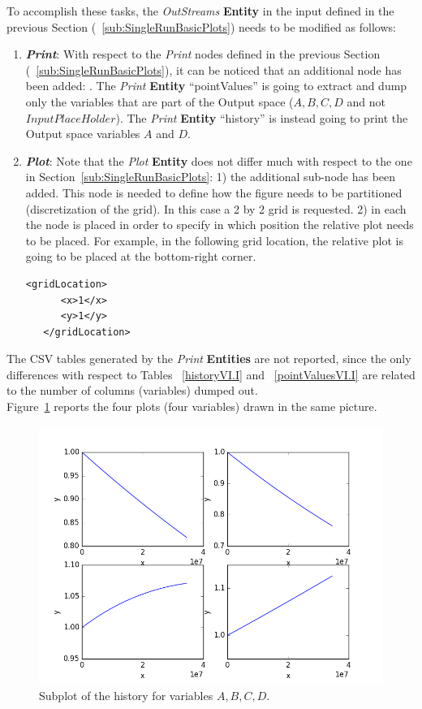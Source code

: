 To accomplish these tasks, the \textit{OutStreams} \textbf{Entity} in the input defined in the previous Section (~\ref{sub:SingleRunBasicPlots}) needs to be modified as follows:
\begin{enumerate}
   \item \textbf{\textit{Print}}:
   With respect to the \textit{Print} nodes defined in the previous Section (~\ref{sub:SingleRunBasicPlots}), it can
   be noticed that an additional node has been added: . The \textit{Print} \textbf{Entity}
   ``pointValues'' is going to extract and dump only the variables that are part of the Output space
   ($A,B,C,D$ and not $InputPlaceHolder$).  The \textit{Print} \textbf{Entity} ``history'' is instead going to print
   the Output space variables $A$ and $D$.

   \item \textbf{\textit{Plot}}:
 Note that the  \textit{Plot} \textbf{Entity} does not differ much with respect to the one in
 Section~\ref{sub:SingleRunBasicPlots}: 1) the additional sub-node   has been added.
 This node is needed to define how the figure needs to be partitioned (discretization of the grid). In this case
 a 2 by 2 grid is requested. 2) in each  the node  is placed in
 order to specify in which position the relative plot needs to be placed. For example, in the following grid
 location, the relative plot is going to be placed at the bottom-right corner.
  \begin{lstlisting}[style=XML,morekeywords={arg,extension,pauseAtEnd,overwrite}]
   <gridLocation>
      <x>1</x>
      <y>1</y>
   </gridLocation>
   \end{lstlisting}
 \end{enumerate}
The CSV tables generated by the \textit{Print} \textbf{Entities} are not reported, since the only differences with respect to Tables ~\ref{historyVI.I} and ~\ref{pointValuesVI.I} are related to the number of columns (variables)
dumped out.
\\Figure~\ref{fig:historySubPlotLine} reports the four plots (four variables) drawn in the same picture.
 \begin{figure}[h!]
  \centering
  \includegraphics[scale=0.7]{../../tests/framework/user_guide/SingleRuns/gold/sectionVI.II/1-historyPlot_line-line-line-line.png}
  \caption{Subplot of the history for variables $A,B,C,D$.}
  \label{fig:historySubPlotLine}
 \end{figure}

